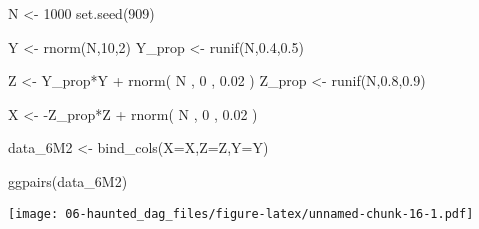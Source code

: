\documentclass[
]{book}
\newenvironment{Shaded}{\begin{snugshade}}{\end{snugshade}}
\newcommand{\AttributeTok}[1]{\textcolor[rgb]{0.77,0.63,0.00}{#1}}
\newcommand{\DecValTok}[1]{\textcolor[rgb]{0.00,0.00,0.81}{#1}}
\newcommand{\FloatTok}[1]{\textcolor[rgb]{0.00,0.00,0.81}{#1}}
\newcommand{\FunctionTok}[1]{\textcolor[rgb]{0.00,0.00,0.00}{#1}}
\newcommand{\NormalTok}[1]{#1}
\newcommand{\OtherTok}[1]{\textcolor[rgb]{0.56,0.35,0.01}{#1}}
\newcommand{\SpecialCharTok}[1]{\textcolor[rgb]{0.00,0.00,0.00}{#1}}
\begin{document}
\begin{Shaded}
\begin{Highlighting}[]
\NormalTok{N }\OtherTok{\textless{}{-}} \DecValTok{1000} 
\FunctionTok{set.seed}\NormalTok{(}\DecValTok{909}\NormalTok{) }

\NormalTok{Y }\OtherTok{\textless{}{-}} \FunctionTok{rnorm}\NormalTok{(N,}\DecValTok{10}\NormalTok{,}\DecValTok{2}\NormalTok{)}
\NormalTok{Y\_prop }\OtherTok{\textless{}{-}} \FunctionTok{runif}\NormalTok{(N,}\FloatTok{0.4}\NormalTok{,}\FloatTok{0.5}\NormalTok{) }

\NormalTok{Z }\OtherTok{\textless{}{-}}\NormalTok{ Y\_prop}\SpecialCharTok{*}\NormalTok{Y }\SpecialCharTok{+} \FunctionTok{rnorm}\NormalTok{( N , }\DecValTok{0}\NormalTok{ , }\FloatTok{0.02}\NormalTok{ )}
\NormalTok{Z\_prop }\OtherTok{\textless{}{-}} \FunctionTok{runif}\NormalTok{(N,}\FloatTok{0.8}\NormalTok{,}\FloatTok{0.9}\NormalTok{) }

\NormalTok{X }\OtherTok{\textless{}{-}} \SpecialCharTok{{-}}\NormalTok{Z\_prop}\SpecialCharTok{*}\NormalTok{Z }\SpecialCharTok{+} \FunctionTok{rnorm}\NormalTok{( N , }\DecValTok{0}\NormalTok{ , }\FloatTok{0.02}\NormalTok{ )}

\NormalTok{data\_6M2 }\OtherTok{\textless{}{-}} \FunctionTok{bind\_cols}\NormalTok{(}\AttributeTok{X=}\NormalTok{X,}\AttributeTok{Z=}\NormalTok{Z,}\AttributeTok{Y=}\NormalTok{Y)}

\FunctionTok{ggpairs}\NormalTok{(data\_6M2)}
\end{Highlighting}
\end{Shaded}

\texttt{[image: 06-haunted\_dag\_files/figure-latex/unnamed-chunk-16-1.pdf]}
\end{document}
